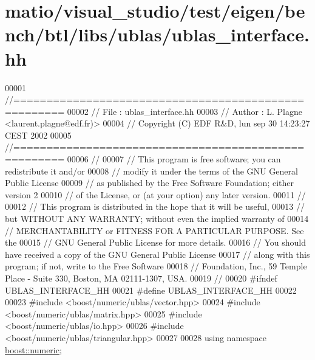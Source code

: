 \hypertarget{matio_2visual__studio_2test_2eigen_2bench_2btl_2libs_2ublas_2ublas__interface_8hh_source}{}\section{matio/visual\+\_\+studio/test/eigen/bench/btl/libs/ublas/ublas\+\_\+interface.hh}
\label{matio_2visual__studio_2test_2eigen_2bench_2btl_2libs_2ublas_2ublas__interface_8hh_source}

\begin{DoxyCode}
00001 \textcolor{comment}{//=====================================================}
00002 \textcolor{comment}{// File   :  ublas\_interface.hh}
00003 \textcolor{comment}{// Author :  L. Plagne <laurent.plagne@edf.fr)>}
00004 \textcolor{comment}{// Copyright (C) EDF R&D,  lun sep 30 14:23:27 CEST 2002}
00005 \textcolor{comment}{//=====================================================}
00006 \textcolor{comment}{//}
00007 \textcolor{comment}{// This program is free software; you can redistribute it and/or}
00008 \textcolor{comment}{// modify it under the terms of the GNU General Public License}
00009 \textcolor{comment}{// as published by the Free Software Foundation; either version 2}
00010 \textcolor{comment}{// of the License, or (at your option) any later version.}
00011 \textcolor{comment}{//}
00012 \textcolor{comment}{// This program is distributed in the hope that it will be useful,}
00013 \textcolor{comment}{// but WITHOUT ANY WARRANTY; without even the implied warranty of}
00014 \textcolor{comment}{// MERCHANTABILITY or FITNESS FOR A PARTICULAR PURPOSE.  See the}
00015 \textcolor{comment}{// GNU General Public License for more details.}
00016 \textcolor{comment}{// You should have received a copy of the GNU General Public License}
00017 \textcolor{comment}{// along with this program; if not, write to the Free Software}
00018 \textcolor{comment}{// Foundation, Inc., 59 Temple Place - Suite 330, Boston, MA  02111-1307, USA.}
00019 \textcolor{comment}{//}
00020 \textcolor{preprocessor}{#ifndef UBLAS\_INTERFACE\_HH}
00021 \textcolor{preprocessor}{#define UBLAS\_INTERFACE\_HH}
00022 
00023 \textcolor{preprocessor}{#include <boost/numeric/ublas/vector.hpp>}
00024 \textcolor{preprocessor}{#include <boost/numeric/ublas/matrix.hpp>}
00025 \textcolor{preprocessor}{#include <boost/numeric/ublas/io.hpp>}
00026 \textcolor{preprocessor}{#include <boost/numeric/ublas/triangular.hpp>}
00027 
00028 \textcolor{keyword}{using namespace }\hyperlink{namespaceboost_1_1numeric}{boost::numeric};

\end{DoxyCode}
